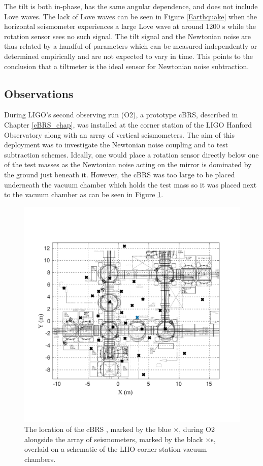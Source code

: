 \documentclass [12pt, proquest]{uwthesis}[2019]
\begin{document}
The tilt is both in-phase, has the same angular dependence, and does not include Love waves. The lack of Love waves can be seen in Figure \ref{Earthquake} when the horizontal seismometer experiences a large Love wave at around 1200 s while the rotation sensor sees no such signal. The tilt signal and the Newtonian noise are thus related by a handful of parameters which can be measured independently or determined empirically and are not expected to vary in time. This points to the conclusion that a tiltmeter is the ideal sensor for Newtonian noise subtraction.

\subsection{Observations}

During LIGO's second observing run (O2), a prototype cBRS, described in Chapter \ref{cBRS_chap}, was installed at the corner station of the LIGO Hanford Observatory along with an array of vertical seismometers. The aim of this deployment was to investigate the Newtonian noise coupling and to test subtraction schemes. Ideally, one would place a rotation sensor directly below one of the test masses as the Newtonian noise acting on the mirror is dominated by the ground just beneath it. However, the cBRS was too large to be placed underneath the vacuum chamber which holds the test mass so it was placed next to the vacuum chamber as can be seen in Figure \ref{NNArray}.

\begin{figure}[!h]
\begin{center}
\includegraphics[width=\textwidth]{NNArrayEdit.pdf}
\end{center}
\caption[The location of the cBRS during O2 alongside the array of seismometers]{The location of the cBRS , marked by the blue $\times$, during O2 alongside the array of seismometers, marked by the black $\times$s, overlaid on a schematic of the LHO corner station vacuum chambers.}
\label{NNArray}
\end{figure}
\end{document}
